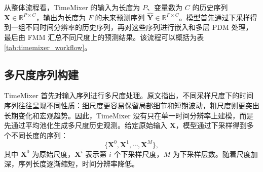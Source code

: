 从整体流程看，TimeMixer 的输入为长度为 $P$、变量数为 $C$ 的历史序列 $\mathbf{X}\in\mathbb{R}^{P\times C}$，输出为长度为 $F$ 的未来预测序列 $\hat{\mathbf{Y}}\in\mathbb{R}^{F\times C}$。模型首先通过下采样得到一组不同时间分辨率的历史序列，再对这些序列进行嵌入和多层 PDM 处理，最后由 FMM 汇总不同尺度上的预测结果。该流程可以概括为表 \ref{tab:timemixer_workflow}。

\begin{table}[htbp]
    \centering
    \caption{原始TimeMixer模型工作流程}
    \label{tab:timemixer_workflow}
\end{table}

\subsection{多尺度序列构建}

TimeMixer 首先对输入序列进行多尺度处理。原文指出，不同采样尺度下的时间序列往往呈现不同性质：细尺度更容易保留局部细节和短期波动，粗尺度则更突出长期变化和宏观趋势。因此，TimeMixer 没有只在单一时间分辨率上建模，而是先通过平均池化生成多尺度历史观测。给定原始输入 $\mathbf{X}$，模型通过下采样得到多个不同长度的序列：
\begin{equation}
    \{\mathbf{X}^{0}, \mathbf{X}^{1}, \cdots, \mathbf{X}^{M}\},
\end{equation}
其中 $\mathbf{X}^{0}$ 为原始尺度，$\mathbf{X}^{i}$ 表示第 $i$ 个下采样尺度，$M$ 为下采样层数。随着尺度加深，序列长度逐渐缩短，时间分辨率降低。

